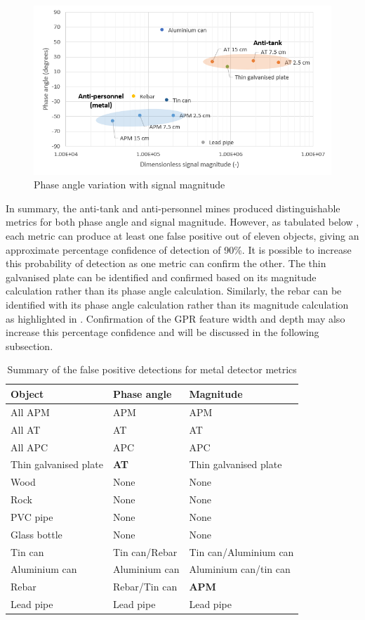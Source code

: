 \documentclass[main.tex]{subfiles}
\begin{document}
\begin{figure}[ht]
\includegraphics[width=\textwidth]{5-Testing/phaseMag.PNG}
\centering
\caption{Phase angle variation with signal magnitude}
\end{figure}

In summary, the anti-tank and anti-personnel mines produced distinguishable metrics for both phase angle and signal magnitude. However, as tabulated below , each metric can produce at least one false positive out of eleven objects, giving an approximate percentage confidence of detection of 90\%. It is possible to increase this probability of detection as one metric can confirm the other. The thin galvanised plate can be identified and confirmed based on its magnitude calculation rather than its phase angle calculation. Similarly, the rebar can be identified with its phase angle calculation rather than its magnitude calculation as highlighted in . Confirmation of the GPR feature width and depth may also increase this percentage confidence and will be discussed in the following subsection. 

\begin{table}[ht]
\centering
\caption{ Summary of the false positive detections for metal detector metrics}
\begin{tabular}{lll}
\toprule
Object & Phase angle & Magnitude \\ \midrule
All APM & APM & APM \\
All AT & AT & AT \\
All APC & APC & APC \\
Thin galvanised plate & \textbf{AT} & Thin galvanised plate \\
Wood & None & None \\
Rock & None & None \\
PVC pipe & None & None \\
Glass bottle & None & None \\
Tin can & Tin can/Rebar & Tin can/Aluminium can \\
Aluminium can & Aluminium can & Aluminium can/tin can \\
Rebar & Rebar/Tin can & \textbf{APM} \\
Lead pipe & Lead pipe & Lead pipe\\ \bottomrule
\end{tabular}
\end{table}
\end{document}
